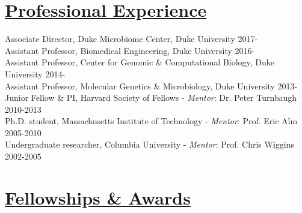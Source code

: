 \documentclass[overlapped,line,11pt]{res}
\begin{document}
\begin{resume}
\section{\underline{\sc Professional Experience}}
\vspace{.05in}
Associate Director, Duke Microbiome Center, Duke
University \hfill 2017-\hspace{7.5mm} \\
Assistant Professor, Biomedical Engineering, Duke
University \hfill 2016-\hspace{7.5mm} \\
Assistant Professor, Center for Genomic \& Computational Biology, Duke
University \hfill 2014-\hspace{7.5mm} \\
Assistant Professor,  Molecular Genetics \& Microbiology, Duke
University \hfill 2013-\hspace{7.5mm} \\
Junior Fellow \& PI, Harvard Society of Fellows - \emph{Mentor}: Dr. Peter Turnbaugh \hfill 2010-2013\\
Ph.D. student, Massachusetts Institute of Technology - \emph{Mentor}: Prof. Eric Alm \hfill
2005-2010 \\
Undergraduate researcher, Columbia University - \emph{Mentor}: Prof. Chris Wiggins
\hfill 2002-2005 

\section{\underline{\sc Fellowships \& Awards}} 
\vspace{.25in}


\end{resume}
\end{document}
